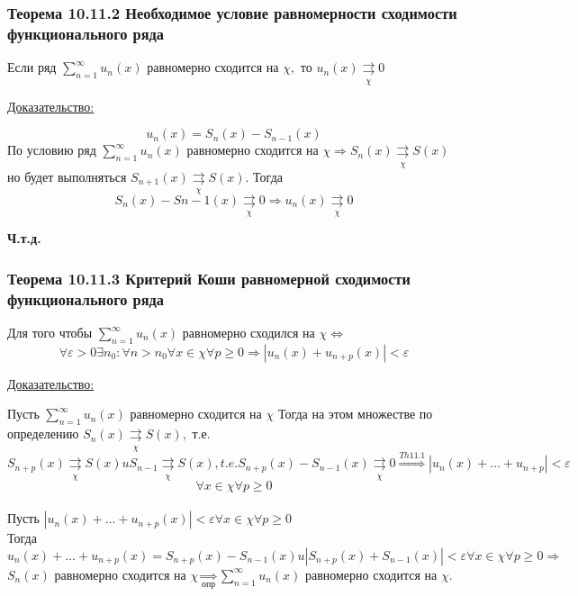 \documentclass[12pt]{article}
\newcommand*\circled[1]{\tikz[baseline=(char.base)]{
    \node[shape=circle, draw, inner sep=1pt, 
        minimum height=12pt] (char) {#1};}}
\let\oldsum\sum
\renewcommand{\sum}{\oldsum\limits}
\begin{document}
  \subsubsection*{Теорема 10.11.2 Необходимое условие равномерности сходимости функционального ряда}\label{th:10.11.2}
  \par\noindent
  Если ряд $\sum_{n=1}^{\infty} u_n(x)$ равномерно сходится на $\chi,$ то $u_n(x)\underset{\chi}{\rightrightarrows} 0$

  \underline{Доказательство:}
  \begin{adjustwidth}{1.5em}{1.5em}
    \[u_n(x)=S_n(x)-S_{n-1}(x)\]
    По условию ряд $\sum_{n=1}^{\infty} u_n(x)$ равномерно сходится на $\chi \Rightarrow S_n(x) \underset{\chi}{\rightrightarrows} S(x)$
    но будет выполняться $S_{n+1}(x)\underset{\chi}{\rightrightarrows} S(x)$. Тогда 
    \[S_n(x)-S{n-1}(x)\underset{\chi}{\rightrightarrows} 0 \Rightarrow u_n(x)\underset{\chi}{\rightrightarrows} 0\]

  \end{adjustwidth}
  \begin{center}
    \textbf{Ч.т.д.}
  \end{center}

  \subsubsection*{Теорема 10.11.3 Критерий Коши равномерной сходимости функционального ряда}\label{th:10.11.3}
  \par\noindent
  Для того чтобы $\sum_{n=1}^{\infty}u_n(x)$ равномерно сходился на $\chi \Leftrightarrow$
  \[\forall \varepsilon> 0 \exists n_0: \forall n>n_0 \forall x \in \chi \forall p \geq 0 \Rightarrow |u_n(x)+u_{n+p}(x)|<\varepsilon\]
  
  \underline{Доказательство:}
  \begin{adjustwidth}{1.5em}{1.5em}
    \circled{$\Rightarrow$} Пусть $\sum_{n=1}^{\infty} u_n(x)$ равномерно сходится на $\chi$ Тогда на этом множестве
    по определению
    $S_n(x)\underset{\chi}{\rightrightarrows} S(x),$ т.е.\\
    \[S_{n+p}(x)\underset{\chi}{\rightrightarrows} S(x) u S_{n-1}\underset{\chi}{\rightrightarrows} S(x),t.e. S_{n+p}(x)-S_{n-1}(x)
    \underset{\chi}{\rightrightarrows} 0 \overset{\hyperref[th:10.11.1]{Th 11.1}}{\Rightarrow} 
    |u_n(x)+\dots+u_{n+p}|<\varepsilon\]
    \[\forall x \in \chi \forall p \geq 0\]\\

    \circled{$\Leftarrow$} Пусть $|u_n(x)+\dots+u_{n+p}(x)|<\varepsilon \forall x \in \chi \forall p \geq 0$\\
    Тогда \[u_n(x)+\dots+u_{n+p}(x)=S_{n+p}(x)-S_{n-1}(x) u |S_{n+p}(x)+S_{n-1}(x)|<\varepsilon \forall x \in \chi
    \forall p\geq0 \Rightarrow\]
    $S_n(x)$ равномерно сходится на $\chi \underset{\hyperref[th:10.11.3]{\text{опр}}}{\Rightarrow}
    \sum_{n=1}^{\infty} u_n(x)$ равномерно сходится на $\chi$. \\
  \end{adjustwidth}
\end{document}
